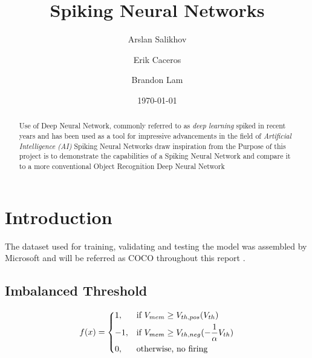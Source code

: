 \documentclass{article}
\title{Spiking Neural Networks}
\author{Arslan Salikhov  \\
	\and 
	Erik Caceros \\
	\and
	Brandon Lam \\
	}
\date{\today}
\begin{document}
\begin{titlingpage}
\maketitle
\end{titlingpage}


\tableofcontents
\newpage


\begin{abstract}
Use of Deep Neural Network, commonly referred to as
\emph{deep learning} spiked in recent years and has been used
as a tool for impressive advancements in the field of 
\emph{Artificial Intelligence (AI)}
Spiking Neural Networks draw inspiration from the 
Purpose of this project is to demonstrate the capabilities of a 
Spiking Neural Network and compare it to a more conventional 
Object Recognition Deep Neural Network
\end{abstract}

\section{Introduction}

The dataset used for training, validating and testing the 
model was assembled by Microsoft and will be referred as
COCO throughout this report .

\subsection{Imbalanced Threshold} 
\[
    f(x)= 
\begin{dcases}
    1 ,& \text{if } {V_{mem}}\geq V_{th,pos}(V_{th})\\
	-1 ,& \text{if } {V_{mem}}\geq V_{th,neg}(-\frac{1}{\alpha}V_{th})\\
    0,              & \text{otherwise, no firing}
\end{dcases}
\]

\newpage


\end{document}
